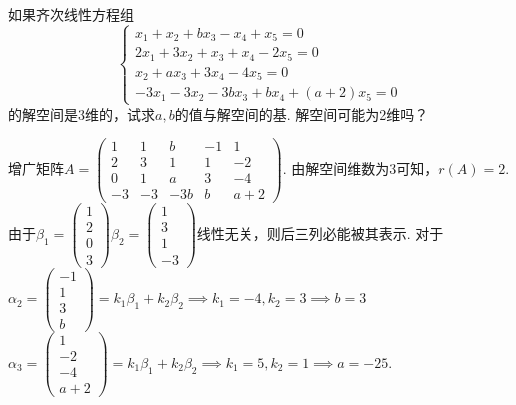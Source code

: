\begin{exercise}
\begin{exgroup}
        \item 如果齐次线性方程组\[\begin{cases}
                x_1+x_2+bx_3-x_4+x_5=0   \\
                2x_1+3x_2+x_3+x_4-2x_5=0 \\
                x_2+ax_3+3x_4-4x_5=0     \\
                -3x_1-3x_2-3bx_3+bx_4+(a+2)x_5=0
            \end{cases}\]的解空间是3维的，试求$a,b$的值与解空间的基. 解空间可能为2维吗？
        \begin{answer}
            增广矩阵$A=\begin{pmatrix}
                1  & 1  & b   & -1 & 1   \\
                2  & 3  & 1   & 1  & -2  \\
                0  & 1  & a   & 3  & -4  \\
                -3 & -3 & -3b & b  & a+2
            \end{pmatrix}$. 由解空间维数为3可知，$r(A)=2$. 由于$\beta_1=\begin{pmatrix}
                1 \\
                2 \\
                0 \\
                3
            \end{pmatrix}
            \beta_2=\begin{pmatrix}
                1 \\
                3 \\
                1 \\
                -3
            \end{pmatrix}$线性无关，则后三列必能被其表示. 对于$\alpha_2=\begin{pmatrix}
                -1 \\
                1  \\
                3  \\
                b
            \end{pmatrix}=k_1\beta_1+k_2\beta_2\implies k_1=-4,k_2=3\implies b=3$\\
        $\alpha_3=\begin{pmatrix}
                1  \\
                -2 \\
                -4 \\
                a+2
            \end{pmatrix}=k_1\beta_1+k_2\beta_2\implies k_1=5,k_2=1\implies a=-25$. \\

\end{answer}
\end{exgroup}
\end{exercise}
